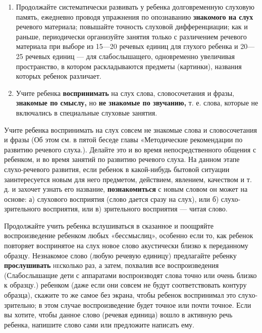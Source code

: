\documentclass{book}
\begin{document}
\begin{enumerate}
\def\labelenumi{\arabic{enumi}.}
\setcounter{enumi}{1}
\item
  
  Продолжайте систематически развивать у ребенка долговременную слуховую
  память, ежедневно проводя упражнения по опознаванию \textbf{знакомого
  на слух} речевого материала; повышайте точность слуховой
  дифференциации; как и раньше, периодически организуйте занятия только
  с различением речевого материала при выборе из 15---20 речевых единиц
  для глухого ребенка и 20---25 речевых единиц --- для слабослышащего,
  одновременно увеличивая пространство, в котором раскладываются
  предметы (картинки), названия которых ребенок различает.
  
\item
  
  Учите ребенка \textbf{воспринимать} на слух слова, словосочетания и
  фразы, \textbf{знакомые по смыслу,} но \textbf{не знакомые по
  звучанию,} т. е. слова, которые не включались в специальные слуховые
  занятия.
  
\end{enumerate}


Учите ребенка воспринимать на слух совсем не знакомые слова и
словосочетания и фразы (Об этом см. в пятой беседе главы «Методические
рекомендации по развитию речевого слуха.). Делайте это и во время
непосредственного общения с ребенком, и во время занятий по развитию
речевого слуха. На данном этапе слухо-речевого развития, если ребенок в
какой-нибудь бытовой ситуации заинтересуется новым для него предметом,
действием, явлением, качеством и т. д. и захочет узнать его название,
\textbf{познакомиться} с новым словом он может на основе: а) слухового
восприятия (слово дается сразу на слух), или б) слухо-зрительного
восприятия, или в) зрительного восприятия --- читая слово.

Продолжайте учить ребенка вслушиваться в сказанное и поощряйте
воспроизведение ребенком любых «бессмыслиц», особенно если то, как
ребенок повторяет воспринятое на слух новое слово акустически близко к
переданному образцу. Незнакомое слово (любую речевую единицу)
предлагайте ребенку \textbf{прослушивать} \textsc{не}сколько раз, а
затем, похвалив все воспроизведения (Слабослышащие дети с аппаратами
воспроизводят слова точно или очень близко к образцу.) ребенком (даже
если они совсем не будут соответствовать контуру образца), скажите то же
самое без экрана, чтобы ребенок воспринимал это слухо-зрительно; в этом
случае воспроизведение будет точное или почти точное. Если вы хотите,
чтобы данное слово (речевая единица) вошло в активную речь ребенка,
напишите слово сами или предложите написать ему.
\end{document}

